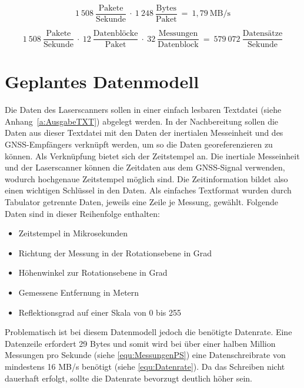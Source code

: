 \documentclass[a4paper,12pt,bibliography=totoc, listof=totoc,titlepage,pointlessnumbers]{scrreprt}
\begin{document}
\begin{equation}
1~508~\frac{\text{Pakete}}{\text{Sekunde}}~\cdot~1~248~\frac{\text{Bytes}}{\text{Paket}}~=~1,79~\text{MB/s}
 \label{equ:Ausgangsrate}
\end{equation}

\begin{equation}
1~508~\frac{\text{Pakete}}{\text{Sekunde}}~\cdot~12~\frac{\text{Datenbl\"{o}cke}}{\text{Paket}}~\cdot~
32~\frac{\text{Messungen}}{\text{Datenblock}}~=~579~072~\frac{\text{Datens\"{a}tze}}{\text{Sekunde}}
 \label{equ:MessungenPS}
\end{equation}

\section{Geplantes Datenmodell}
\label{s:datenmodell}
Die Daten des Laser\-scan\-ners sollen in einer einfach lesbaren Textdatei (siehe Anhang~\ref{a:AusgabeTXT}) abgelegt werden. In der Nachbereitung sollen die Daten aus dieser Textdatei mit den Daten der inertialen Messeinheit und des GNSS-Empfängers verknüpft werden, um so die Daten georeferenzieren zu können. Als Verknüpfung bietet sich der Zeitstempel an. Die inertiale Messeinheit und der Laser\-scan\-ner können die Zeitdaten aus dem GNSS-Signal verwenden, wodurch hochgenaue Zeitstempel möglich sind. Die Zeitinformation bildet also einen wichtigen Schlüssel in den Daten. Als einfaches Textformat wurden durch Tabulator getrennte Daten, jeweils eine Zeile je Messung, gewählt. Folgende Daten sind in dieser Reihenfolge enthalten:

\begin{itemize}
 \item Zeitstempel in Mikrosekunden
 \item Richtung der Messung in der Rotationsebene in Grad
 \item Höhenwinkel zur Rotationsebene in Grad
 \item Gemessene Entfernung in Metern
 \item Reflektionsgrad auf einer Skala von 0 bis 255
\end{itemize}

Problematisch ist bei diesem Datenmodell jedoch die benötigte Datenrate. Eine Datenzeile erfordert 29 Bytes und somit wird bei über einer halben Million Messungen pro Sekunde (siehe \autoref{equ:MessungenPS}) eine Datenschreibrate von mindestens 16 MB/s benötigt (siehe \autoref{equ:Datenrate}). Da das Schreiben nicht dauerhaft erfolgt, sollte die Datenrate bevorzugt deutlich höher sein.
\end{document}
